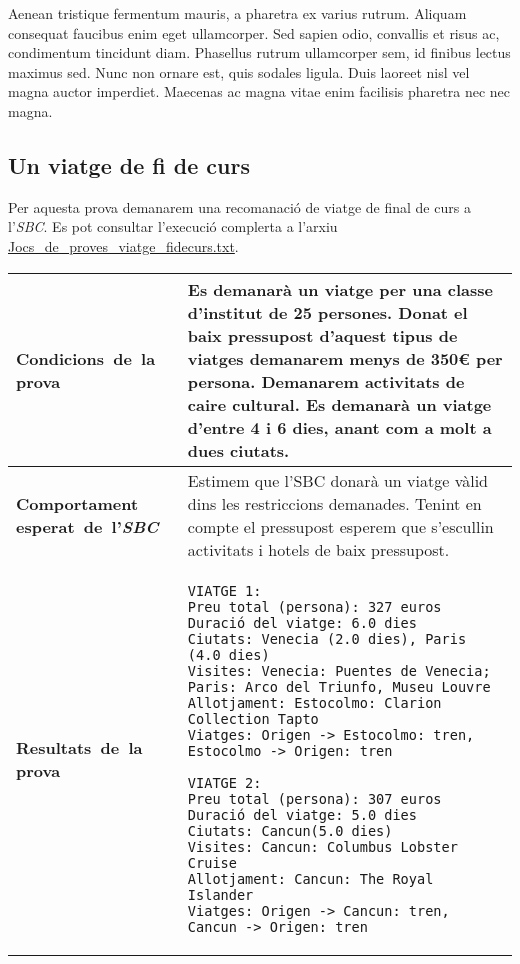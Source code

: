 \documentclass[11pt,a4paper]{article}
\begin{document}
Aenean tristique fermentum mauris, a pharetra ex varius rutrum. Aliquam consequat faucibus enim eget ullamcorper. Sed sapien odio, convallis et risus ac, condimentum tincidunt diam. Phasellus rutrum ullamcorper sem, id finibus lectus maximus sed. Nunc non ornare est, quis sodales ligula. Duis laoreet nisl vel magna auctor imperdiet. Maecenas ac magna vitae enim facilisis pharetra nec nec magna.


\subsection{Un viatge de fi de curs}
Per aquesta prova demanarem una recomanació de viatge de final de curs a l'\emph{SBC}. Es pot consultar l'execució complerta a l'arxiu \url{Jocs_de_proves_viatge_fidecurs.txt}.\\

\noindent
\begin{tabular}{|p{}|p{}|}
\hline
\textbf{\mbox{Condicions de la} \mbox{prova}} & Es demanarà un viatge per una classe d'institut de 25 persones. Donat el baix pressupost d'aquest tipus de viatges demanarem menys de 350\euro{} per persona. Demanarem activitats de caire cultural. Es demanarà un viatge d'entre 4 i 6 dies, anant com a molt a dues ciutats.\\
\hline
\textbf{Comportament \mbox{esperat de l'\emph{SBC}}} & Estimem que l'SBC donarà un viatge vàlid dins les restriccions demanades. Tenint en compte el pressupost esperem que s'escullin activitats i hotels de baix pressupost. \\
\hline
\textbf{\mbox{Resultats de la} \mbox{prova}} & \begin{verbatim}VIATGE 1:
Preu total (persona): 327 euros
Duració del viatge: 6.0 dies
Ciutats: Venecia (2.0 dies), Paris (4.0 dies)
Visites: Venecia: Puentes de Venecia; Paris: Arco del Triunfo, Museu Louvre
Allotjament: Estocolmo: Clarion Collection Tapto
Viatges: Origen -> Estocolmo: tren, Estocolmo -> Origen: tren

VIATGE 2:
Preu total (persona): 307 euros
Duració del viatge: 5.0 dies
Ciutats: Cancun(5.0 dies)
Visites: Cancun: Columbus Lobster Cruise
Allotjament: Cancun: The Royal Islander
Viatges: Origen -> Cancun: tren, Cancun -> Origen: tren

\end{verbatim} \\
\hline
\end{tabular}
\medskip
\end{document}
